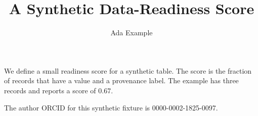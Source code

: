 \documentclass{article}
\title{A Synthetic Data-Readiness Score}
\author{Ada Example}
\begin{document}
\maketitle

We define a small readiness score for a synthetic table. The score is the
fraction of records that have a value and a provenance label. The example has
three records and reports a score of 0.67.

The author ORCID for this synthetic fixture is 0000-0002-1825-0097.
\end{document}
